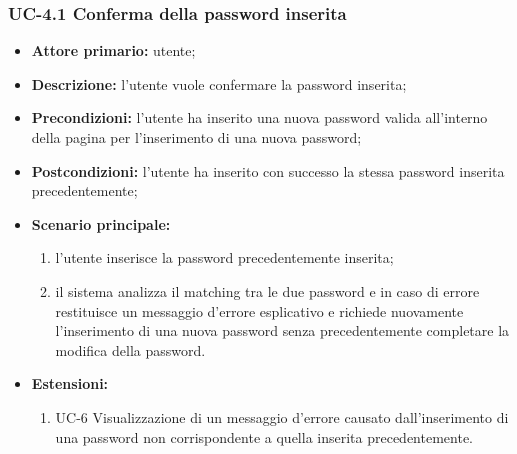 \subsubsection{UC-4.1 Conferma della password inserita}
\begin{itemize}
	\item \textbf{Attore primario:} utente;

	\item \textbf{Descrizione:} l'utente vuole confermare la password inserita;

	\item \textbf{Precondizioni:} l'utente ha inserito una nuova password valida all'interno della pagina per l'inserimento di una nuova password;

	\item \textbf{Postcondizioni:} l'utente ha inserito con successo la stessa password inserita precedentemente;

	\item \textbf{Scenario principale:}
	      \begin{enumerate}
		      \item l'utente inserisce la password precedentemente inserita;
		      \item il sistema analizza il matching tra le due password e in caso di errore restituisce un messaggio d'errore esplicativo e richiede nuovamente l'inserimento di una nuova password senza precedentemente completare la modifica della password.
	      \end{enumerate}
	\item \textbf{Estensioni:}
	      \begin{enumerate}
		      \item UC-6 Visualizzazione di un messaggio d'errore causato dall'inserimento di una password non corrispondente a quella inserita precedentemente.
	      \end{enumerate}
\end{itemize}
